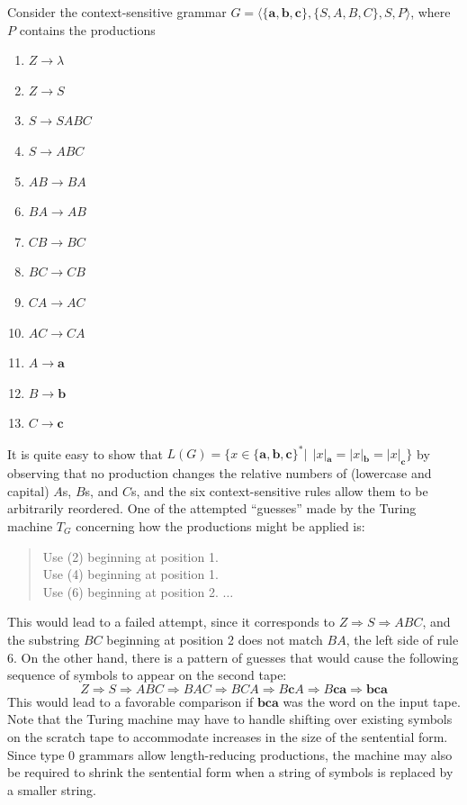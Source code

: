 Consider the context-sensitive grammar $G=\langle\{\pmb{a},\pmb{b},\pmb{c}\},\{
S,A,B,C\},S,P\rangle$, where $P$ contains the productions
\begin{enumerate}[nosep]
\item $Z\rightarrow\lambda$
\item $Z\rightarrow S$
\item $S\rightarrow SABC$
\item $S\rightarrow ABC$
\item $AB\rightarrow BA$
\item $BA\rightarrow AB$
\item $CB\rightarrow BC$
\item $BC\rightarrow CB$
\item $CA\rightarrow AC$
\item $AC\rightarrow CA$
\item $A\rightarrow\pmb{a}$
\item $B\rightarrow\pmb{b}$
\item $C\rightarrow\pmb{c}$
\end{enumerate}
It is quite easy to show that $L(G)=\{x\in\{\pmb{a},\pmb{b},\pmb{c}\}^*|\ \
|x|_{\pmb{a}}=|x|_{\pmb{b}}=|x|_{\pmb{c}}\}$ by observing that no production
changes the relative numbers of (lowercase and capital) $A$s, $B$s, and $C$s,
and the six context-sensitive rules allow them to be arbitrarily reordered. One
of the attempted ``guesses'' made by the Turing machine $T_G$ concerning how the
productions might be applied is:
\begin{quote}
Use (2) beginning at position 1. \\
Use (4) beginning at position 1. \\
Use (6) beginning at position 2. $\ldots$
\end{quote}
This would lead to a failed attempt, since it corresponds to $Z\Rightarrow S
\Rightarrow ABC$, and the substring $BC$ beginning at position 2 does not match
$BA$, the left side of rule 6. On the other hand, there is a pattern of guesses
that would cause the following sequence of symbols to appear on the second tape:
\[ Z\Rightarrow S\Rightarrow ABC\Rightarrow BAC\Rightarrow BCA\Rightarrow
	B\pmb{c}A\Rightarrow B\pmb{ca}\Rightarrow\pmb{bca} \]
This would lead to a favorable comparison if $\pmb{bca}$ was the word on the
input tape. Note that the Turing machine may have to handle shifting over
existing symbols on the scratch tape to accommodate increases in the size of the
sentential form. Since type 0 grammars allow length-reducing productions, the
machine may also be required to shrink the sentential form when a string of
symbols is replaced by a smaller string.

